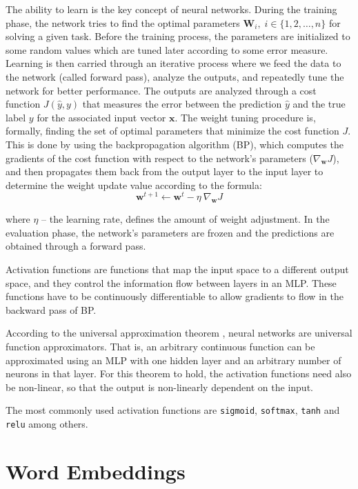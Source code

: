 The ability to learn is the key concept of neural networks. During the training phase, the network tries to find the optimal parameters $\mathbf{W}_i, \; i \in \{1, 2, \ldots, n\}$ for solving a given task. Before the training process, the parameters are initialized to some random values which are tuned later according to some error measure. Learning is then carried through an iterative process where we feed the data to the network (called forward pass), analyze the outputs, and repeatedly tune the network for better performance. The outputs are analyzed through a cost function  $J(\hat y, y)$ that measures the error between the prediction $\hat y$ and the true label $y$ for the associated input vector $\mathbf{x}$. The weight tuning procedure is, formally, finding the set of optimal parameters that minimize the cost function $J$. This is done by using the backpropagation algorithm (BP), which computes the gradients of the cost function with respect to the network's parameters ($\nabla_{\mathbf{w}} J$), and then propagates them back from the output layer to the input layer to determine the weight update value according to the formula:
\[ \mathbf{w}^{t+1} \leftarrow  \mathbf{w}^{t} - \eta \ \nabla_{\mathbf{w}} J  \]

where $\eta$ -- the learning rate, defines the amount of weight adjustment. In the evaluation phase, the network's parameters are frozen and the predictions are obtained through a forward pass.

Activation functions are functions that map the input space to a different output space, and they control the information flow between layers in an MLP. These functions have to be continuously differentiable to allow gradients to flow in the backward pass of BP.

According to the universal approximation theorem \citep{csaji2001approximation}, neural networks are universal function approximators. That is, an arbitrary continuous function can be approximated using an MLP with one hidden layer and an arbitrary number of neurons in that layer. For this theorem to hold, the activation functions need also be non-linear, so that the output is non-linearly dependent on the input.

The most commonly used activation functions are \texttt{sigmoid}, \texttt{softmax}, \texttt{tanh} and \texttt{relu} among others.



\section{Word Embeddings}
\label{sec:embeddings}

